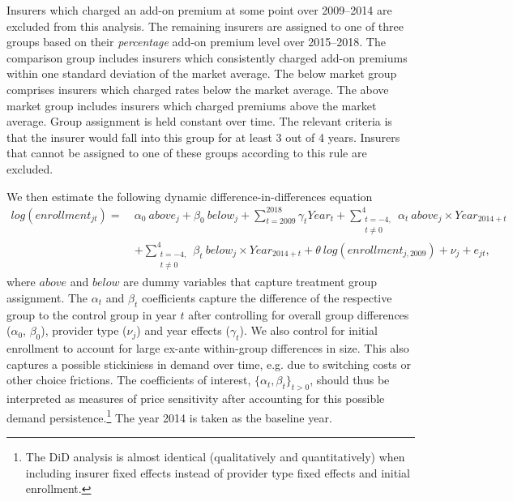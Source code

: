 \documentclass[a4paper, 11pt, english]{article}
\begin{document}
Insurers which charged an add-on premium at some point over 2009--2014 are excluded from this analysis. The remaining insurers are assigned to one of three groups based on their \textit{percentage} add-on premium level over 2015--2018. The comparison group includes insurers which consistently charged add-on premiums within one standard deviation of the market average. The below market group comprises insurers which charged rates below the market average. The above market group includes insurers which charged premiums above the market average. Group assignment is held constant over time. The relevant criteria is that the insurer would fall into this group for at least 3 out of 4 years. Insurers that cannot be assigned to one of these groups according to this rule are excluded.

We then estimate the following dynamic difference-in-differences equation
\begin{equation} \label{eq:did}
\begin{split}
	log(enrollment_{jt}) =  \ & \alpha_0 \ above_j + \beta_0 \ below_j + \sum_{t=2009}^{2018} \gamma_t Year_t  + \sum_{\substack{t=-4, \\ t \neq 0}}^{4} \alpha_t \ above_j \times Year_{2014+t}  \\ 
	&  + \sum_{\substack{t=-4, \\ t \neq 0}}^{4} \beta_t \ below_j \times Year_{2014+t} + \theta \ log(enrollment_{j,2009}) + \nu_j + e_{jt},
\end{split}
\end{equation}
where $above$ and $below$ are dummy variables that capture treatment group assignment. The $\alpha_t$ and $\beta_t$ coefficients capture the difference of the respective group to the control group in year $t$ after controlling for overall group differences ($\alpha_0$, $\beta_0$), provider type ($\nu_j$) and year effects ($\gamma_t$). We also control for initial enrollment to account for large ex-ante within-group differences in size. This also captures a possible stickiniess in demand over time, e.g. due to switching costs or other choice frictions. The coefficients of interest, $\{\alpha_t,\beta_t\}_{t>0}$, should thus be interpreted as measures of price sensitivity after accounting for this possible demand persistence.\footnote{The DiD analysis is almost identical (qualitatively and quantitatively) when including insurer fixed effects instead of provider type fixed effects and initial enrollment.} The year 2014 is taken as the baseline year.
\end{document}
